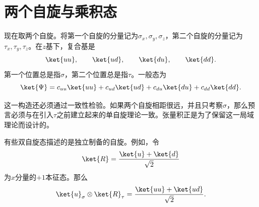 \begin{classroomqa}
\end{classroomqa}

\section{两个自旋与乘积态}

现在取两个自旋。将第一个自旋的分量记为\(\sigma_x,\sigma_y,\sigma_z\)，第二个自旋的分量记为\(\tau_x,\tau_y,\tau_z\)。在\(z\)基下，复合基是
\begin{equation}
\ket{uu},\qquad \ket{ud},\qquad \ket{du},\qquad \ket{dd}.
\label{eq:l6-two-spin-basis}
\end{equation}
第一个位置总是指\(\sigma\)，第二个位置总是指\(\tau\)。一般态为
\begin{equation}
\ket{\Psi}
=c_{uu}\ket{uu}+c_{ud}\ket{ud}
+c_{du}\ket{du}+c_{dd}\ket{dd}.
\label{eq:l6-general-two-spin}
\end{equation}

\begin{classroomqa}
\end{classroomqa}

这一构造还必须通过一致性检验。如果两个自旋相距很远，并且只考察\(\sigma\)，那么预言必须与在引入\(\tau\)之前建立起来的单自旋理论一致。张量积正是为了保留这一局域理论而设计的。

有些双自旋态描述的是独立制备的自旋。例如，令
\begin{equation}
\ket{R}=\frac{\ket{u}+\ket{d}}{\sqrt2}
\end{equation}
为\(x\)分量的\(+1\)本征态。那么
\begin{equation}
\ket{u}_{\sigma}\otimes\ket{R}_{\tau}
=\frac{\ket{uu}+\ket{ud}}{\sqrt2}.
\label{eq:l6-up-right-product}
\end{equation}

\begin{classroomqa}
\end{classroomqa}

